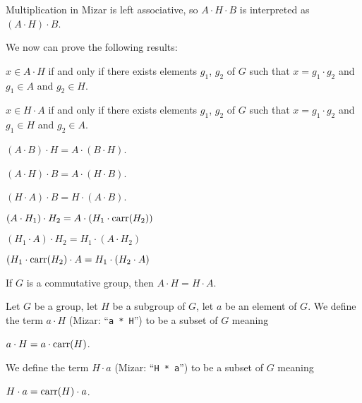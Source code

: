 \documentclass{article}
\begin{document}
\begin{remark}
Multiplication in Mizar is left associative, so $A\cdot H\cdot B$
is interpreted as $(A\cdot H)\cdot B$.
\end{remark}

We now can prove the following results:
\begin{thm}
\item\label{group2:94} $x\in A\cdot H$ if and only if there exists
  elements $g_{1}$, $g_{2}$ of $G$ such that $x=g_{1}\cdot g_{2}$ and
  $g_{1}\in A$ and $g_{2}\in H$.
\item\label{group2:95} $x\in H\cdot A$ if and only if there exists
  elements $g_{1}$, $g_{2}$ of $G$ such that $x=g_{1}\cdot g_{2}$ and
  $g_{1}\in H$ and $g_{2}\in A$.
\item\label{group2:96} $(A\cdot B)\cdot H=A\cdot(B\cdot H)$.
\item\label{group2:97} $(A\cdot H)\cdot B=A\cdot(H\cdot B)$.
\item\label{group2:98} $(H\cdot A)\cdot B=H\cdot(A\cdot B)$.
\item\label{group2:99} $(A\cdot H_{1})\cdot H_{2}=A\cdot(H_{1}\cdot\operatorname{carr}(H_{2}))$
\item\label{group2:100} $(H_{1}\cdot A)\cdot H_{2}=H_{1}\cdot(A\cdot H_{2})$
\item\label{group2:101} $(H_{1}\cdot\operatorname{carr}(H_{2})\cdot A=H_{1}\cdot(H_{2}\cdot A)$
\item\label{group2:102} If $G$ is a commutative group, then $A\cdot H=H\cdot A$.
\end{thm}

\begin{definition}
Let $G$ be a group, let $H$ be a subgroup of $G$, let $a$ be an element
of $G$.
We define the term $a\cdot H$ (Mizar: ``\verb#a * H#'') to be a subset
of $G$ meaning
\begin{defn}
\item $a\cdot H=a\cdot\operatorname{carr}(H)$.
\end{defn}
We define the term $H\cdot a$ (Mizar: ``\verb#H * a#'') to be a subset
of $G$ meaning
\begin{defn}
\item $H\cdot a=\operatorname{carr}(H)\cdot a$.
\end{defn}
\end{definition}
\end{document}
